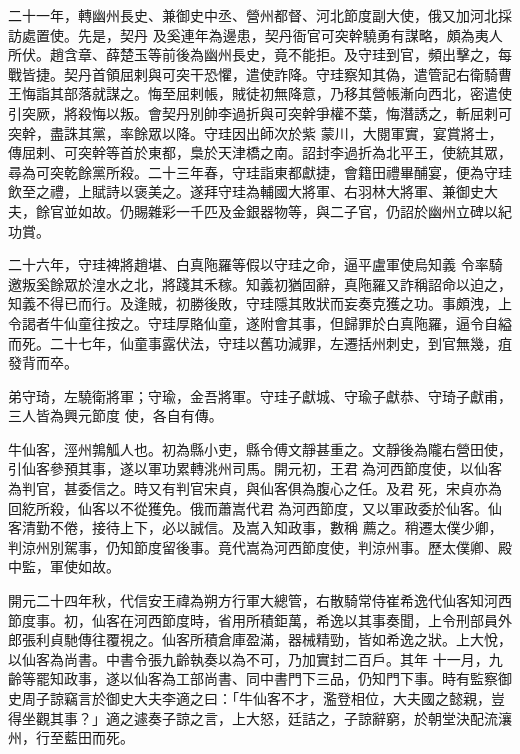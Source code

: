 \begin{pinyinscope}
 二十一年，轉幽州長史、兼御史中丞、營州都督、河北節度副大使，俄又加河北採訪處置使。先是，契丹
 及奚連年為邊患，契丹衙官可突幹驍勇有謀略，頗為夷人所伏。趙含章、薛楚玉等前後為幽州長史，竟不能拒。及守珪到官，頻出擊之，每戰皆捷。契丹首領屈剌與可突干恐懼，遣使詐降。守珪察知其偽，遣管記右衛騎曹王悔詣其部落就謀之。悔至屈剌帳，賊徒初無降意，乃移其營帳漸向西北，密遣使引突厥，將殺悔以叛。會契丹別帥李過折與可突幹爭權不葉，悔潛誘之，斬屈剌可突幹，盡誅其黨，率餘眾以降。守珪因出師次於紫
 蒙川，大閱軍實，宴賞將士，傳屈剌、可突幹等首於東都，梟於天津橋之南。詔封李過折為北平王，使統其眾，尋為可突乾餘黨所殺。二十三年春，守珪詣東都獻捷，會籍田禮畢酺宴，便為守珪飲至之禮，上賦詩以褒美之。遂拜守珪為輔國大將軍、右羽林大將軍、兼御史大夫，餘官並如故。仍賜雜彩一千匹及金銀器物等，與二子官，仍詔於幽州立碑以紀功賞。



 二十六年，守珪裨將趙堪、白真陁羅等假以守珪之命，逼平盧軍使烏知義
 令率騎邀叛奚餘眾於湟水之北，將踐其禾稼。知義初猶固辭，真陁羅又詐稱詔命以迫之，知義不得已而行。及逢賊，初勝後敗，守珪隱其敗狀而妄奏克獲之功。事頗洩，上令謁者牛仙童往按之。守珪厚賂仙童，遂附會其事，但歸罪於白真陁羅，逼令自縊而死。二十七年，仙童事露伏法，守珪以舊功減罪，左遷括州刺史，到官無幾，疽發背而卒。



 弟守琦，左驍衛將軍；守瑜，金吾將軍。守珪子獻城、守瑜子獻恭、守琦子獻甫，三人皆為興元節度
 使，各自有傳。



 牛仙客，涇州鶉觚人也。初為縣小吏，縣令傅文靜甚重之。文靜後為隴右營田使，引仙客參預其事，遂以軍功累轉洮州司馬。開元初，王君為河西節度使，以仙客為判官，甚委信之。時又有判官宋貞，與仙客俱為腹心之任。及君死，宋貞亦為回紇所殺，仙客以不從獲免。俄而蕭嵩代君為河西節度，又以軍政委於仙客。仙客清勤不倦，接待上下，必以誠信。及嵩入知政事，數稱
 薦之。稍遷太僕少卿，判涼州別駕事，仍知節度留後事。竟代嵩為河西節度使，判涼州事。歷太僕卿、殿中監，軍使如故。



 開元二十四年秋，代信安王禕為朔方行軍大總管，右散騎常侍崔希逸代仙客知河西節度事。初，仙客在河西節度時，省用所積鉅萬，希逸以其事奏聞，上令刑部員外郎張利貞馳傳往覆視之。仙客所積倉庫盈滿，器械精勁，皆如希逸之狀。上大悅，以仙客為尚書。中書令張九齡執奏以為不可，乃加實封二百戶。其年
 十一月，九齡等罷知政事，遂以仙客為工部尚書、同中書門下三品，仍知門下事。時有監察御史周子諒竊言於御史大夫李適之曰：「牛仙客不才，濫登相位，大夫國之懿親，豈得坐觀其事？」適之遽奏子諒之言，上大怒，廷詰之，子諒辭窮，於朝堂決配流瀼州，行至藍田而死。




\end{pinyinscope}
